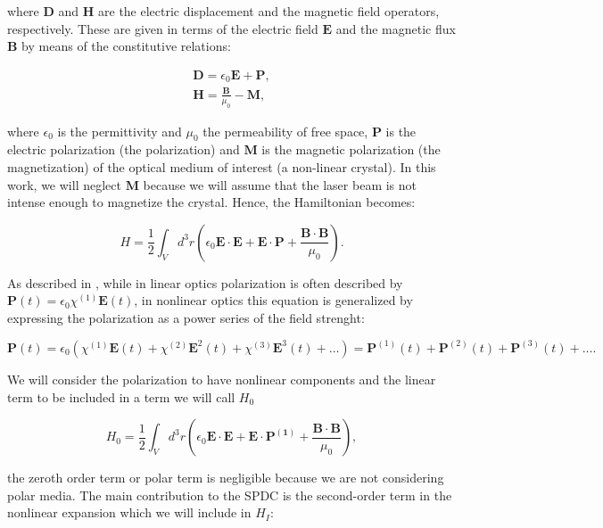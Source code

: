 \documentclass[12pt]{book}
\begin{document}
where $\textbf{D}$ and $\textbf{H}$ are the electric displacement and the magnetic field operators, respectively. These are given in terms of the electric field $\textbf{E}$ and the magnetic flux $\textbf{B}$ by means of the constitutive relations:


\begin{align}
\textbf{D}= \epsilon_{0} \textbf{E}+\textbf{P},\\
\textbf{H}=\frac{\textbf{B}}{\mu_{0}}-\textbf{M},
\end{align}

where $\epsilon_{0} $ is the permittivity and $\mu_{0}$ the permeability of free space, $\mathbf{P}$ is the electric polarization (the polarization) and $\mathbf{M}$ is the magnetic polarization (the magnetization) of the optical medium of interest (a non-linear crystal). In this work, we will neglect $\textbf{M}$ because we will assume that the laser beam is not intense enough to magnetize the crystal. Hence, the Hamiltonian becomes:

\begin{equation}
H=\frac{1}{2}\int_{V} d^{3}r \left(\epsilon_{0}\mathbf{E \cdot E}+\mathbf{E \cdot P}+\frac{\mathbf{B \cdot B}}{\mu_{0}} \right).
\end{equation}


As described in \cite{boyd}, while in linear optics polarization is often described by $\mathbf{P}(t)=\epsilon_{0} \chi^{(1)}\mathbf{E}(t)$, in nonlinear optics this equation is generalized by expressing the polarization as a power series of the field strenght:

\begin{equation}
\mathbf{P}(t)=\epsilon_{0} \left( \chi^{(1)}\mathbf{E}(t)+\chi^{(2)}\mathbf{E}^{2}(t)+\chi^{(3)}\mathbf{E}^{3}(t)+ \dots \right)=\mathbf{P}^{(1)}(t)+\mathbf{P}^{(2)}(t)+\mathbf{P}^{(3)}(t)+ \dots .
\end{equation}

 We will consider the polarization to have nonlinear components and the linear term to be included in a term we will call $H_{0}$
 
\begin{equation}
 H_{0}=\frac{1}{2}\int_{V} d^{3}r \left(\epsilon_{0}\mathbf{E \cdot E}+\mathbf{E} \cdot \mathbf{P^{(1)}}+\frac{\mathbf{B \cdot B}}{\mu_{0}} \right),
\end{equation}

  the zeroth order term or polar term is negligible because we are not considering polar media. The main contribution to the SPDC is the second-order term in the nonlinear expansion which we will include in $H_{I}$:
\end{document}

